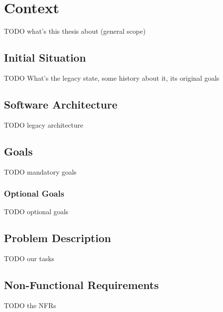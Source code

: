 \chapter{Context}
TODO what's this thesis about (general scope)

\section{Initial Situation}
TODO What's the legacy state, some history about it, its original goals

\section{Software Architecture}
TODO legacy architecture\\


\section{Goals}
TODO mandatory goals

\subsection*{Optional Goals}
TODO optional goals

\section{Problem Description}
TODO our tasks

\section{Non-Functional Requirements}
TODO the NFRs
